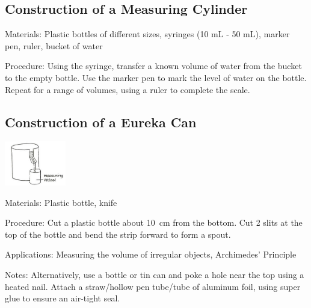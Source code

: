 \begin{multicols}{2}
\subsection{Construction of a Measuring Cylinder}
\label{sub:meascyl}
\begin{description*}
\item[Materials:]{Plastic bottles of different sizes, syringes (10 mL - 50 mL), marker pen, ruler, bucket of water}
\item[Procedure:]{Using the syringe, transfer a known volume of water from the bucket to the empty bottle. Use the marker pen to mark the level of water on the bottle. Repeat for a range of volumes, using a ruler to complete the scale.}
\end{description*}

\subsection{Construction of a Eureka Can}
\label{sub:eurekacan}

\begin{center}
\includegraphics[width=0.2\textwidth]{./img/vso/overflow-can.png}
\end{center}

\begin{description*}
\item[Materials:]{Plastic bottle, knife}
\item[Procedure:]{Cut a plastic bottle about 10~cm from the bottom. Cut 2 slits at the top of the bottle and bend the strip forward to form a spout.}
\item[Applications:]{Measuring the volume of irregular objects, Archimedes' Principle}
\item[Notes:]{Alternatively, use a bottle or tin can and poke a hole near the top using a heated nail. Attach a straw/hollow pen tube/tube of aluminum foil, using super glue to ensure an air-tight seal.}
\end{description*}


\end{multicols}
